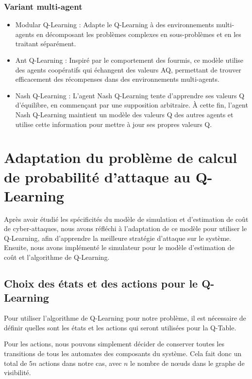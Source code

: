 \documentclass[a4paper]{article}
\begin{document}
    \subsubsection{Variant multi-agent}

    \begin{itemize}
        \item Modular Q-Learning \cite{ono_multi-agent_1996} : Adapte le Q-Learning à des environnements multi-agents en décomposant les problèmes complexes en sous-problèmes et en les traitant séparément.
        \item Ant Q-Learning \cite{gambardella_ant-q_1995} : Inspiré par le comportement des fourmis, ce modèle utilise des agents coopératifs qui échangent des valeurs AQ, permettant de trouver efficacement des récompenses dans des environnements multi-agents.
        \item Nash Q-Learning \cite{hu_nash_nodate} : L'agent Nash Q-Learning tente d'apprendre ses valeurs Q d'équilibre, en commençant par une supposition arbitraire. À cette fin, l'agent Nash Q-Learning maintient un modèle des valeurs Q des autres agents et utilise cette information pour mettre à jour ses propres valeurs Q.
    \end{itemize}

    \section{Adaptation du problème de calcul de probabilité d'attaque au Q-Learning}

    Après avoir étudié les spécificités du modèle de simulation et d'estimation de coût de cyber-attaques, nous avons réfléchi à l'adaptation de ce modèle pour utiliser le Q-Learning, afin d'apprendre la meilleure stratégie d'attaque sur le système.
    Ensuite, nous avons implémenté le simulateur pour le modèle d'estimation de coût et l'algorithme de Q-Learning.

    \subsection{Choix des états et des actions pour le Q-Learning}

    Pour utiliser l'algorithme de Q-Learning pour notre problème, il est nécessaire de définir quelles sont les états et les actions qui seront utilisées pour la Q-Table.

    Pour les actions, nous pouvons simplement décider de conserver toutes les transitions de tous les automates des composants du système. Cela fait donc un total de $5n$ actions dans notre cas, avec $n$ le nombre de n\oe uds dans le graphe de visibilité.
\end{document}

